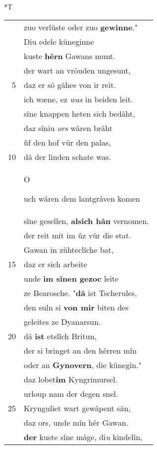 \documentclass[8pt,a4paper,notitlepage]{article}
\begin{document}
\begin{table}[ht]
\begin{minipage}[t]{0.5\linewidth}
\end{minipage}
\hspace{0.5cm}
\begin{minipage}[t]{0.5\linewidth}
\small
\begin{center}*T
\end{center}
\begin{tabular}{rl}
 & zuo verlüste oder zuo \textbf{gewinne}."\\ 
 & Diu edele küneginne\\ 
 & kuste \textbf{hêrn} Gawans munt.\\ 
 & der wart an vröuden ungesunt,\\ 
5 & daz er sô gâhes von ir reit.\\ 
 & ich wæne, ez \textit{was} in beiden leit.\\ 
 & sîne knappen heten sich bedâht,\\ 
 & daz sîniu \textit{ors} wâren brâht\\ 
 & ûf den hof vür den palas,\\ 
10 & dâ der linden schate was.\\ 
 & \begin{large}O\end{large}uch wâren dem lantgrâven komen\\ 
 & sîne gesellen, \textbf{alsich hân} vernomen.\\ 
 & der reit mit im ûz vür die stat.\\ 
 & Gawan in zühteclîche bat,\\ 
15 & daz er sich arbeite\\ 
 & unde \textbf{im sînen gezoc} leite\\ 
 & ze Bearosche. "\textbf{dâ} ist Tscherules,\\ 
 & den suln si \textbf{von mir} biten des\\ 
 & geleites ze Dyanarsun.\\ 
20 & dâ \textbf{ist} etslîch Britun,\\ 
 & der si bringet an den hêrren mîn\\ 
 & oder an \textbf{Gynovern}, die künegîn."\\ 
 & daz lobet\textbf{im} Kyngrimursel.\\ 
 & urloup nam der degen snel.\\ 
25 & Krynguliet wart gewâpent sân,\\ 
 & daz ors, unde mîn hêr Gawan.\\ 
 & \textbf{der} kuste sîne mâge, di\textit{u} kindelîn,\\ 

\end{tabular}
\end{minipage}
\end{table}
\end{document}
